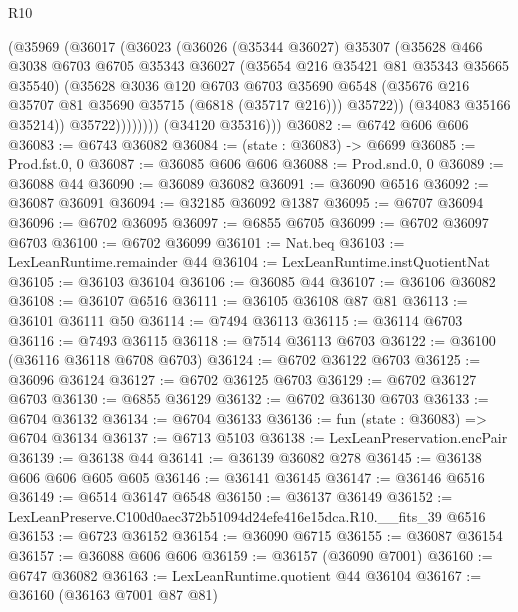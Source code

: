\begin{lexlean}{R10}
\begin{coremodule}
                  (@35969
                    (@36017
                      (@36023
                        (@36026
                          (@35344 @36027)
                          @35307
                          (@35628
                            @466
                            @3038
                            @6703
                            @6705
                            @35343
                            @36027
                            (@35654 @216 @35421 @81 @35343 @35665 @35540)
                            (@35628
                              @3036
                              @120
                              @6703
                              @6703
                              @35690
                              @6548
                              (@35676 @216 @35707 @81 @35690 @35715 (@6818 (@35717 @216)))
                              @35722))
                          (@34083 @35166 @35214))
                        @35722))))))))
        (@34120 @35316)))
@36082 := @6742 @606 @606
@36083 := @6743 @36082
@36084 := (state : @36083) -> @6699
@36085 := Prod.fst.{0, 0}
@36087 := @36085 @606 @606
@36088 := Prod.snd.{0, 0}
@36089 := @36088 @44
@36090 := @36089 @36082
@36091 := @36090 @6516
@36092 := @36087 @36091
@36094 := @32185 @36092 @1387
@36095 := @6707 @36094
@36096 := @6702 @36095
@36097 := @6855 @6705
@36099 := @6702 @36097 @6703
@36100 := @6702 @36099
@36101 := Nat.beq
@36103 := LexLeanRuntime.remainder @44
@36104 := LexLeanRuntime.instQuotientNat
@36105 := @36103 @36104
@36106 := @36085 @44
@36107 := @36106 @36082
@36108 := @36107 @6516
@36111 := @36105 @36108 @87 @81
@36113 := @36101 @36111 @50
@36114 := @7494 @36113
@36115 := @36114 @6703
@36116 := @7493 @36115
@36118 := @7514 @36113 @6703
@36122 := @36100 (@36116 @36118 @6708 @6703)
@36124 := @6702 @36122 @6703
@36125 := @36096 @36124
@36127 := @6702 @36125 @6703
@36129 := @6702 @36127 @6703
@36130 := @6855 @36129
@36132 := @6702 @36130 @6703
@36133 := @6704 @36132
@36134 := @6704 @36133
@36136 := fun (state : @36083) => @6704 @36134
@36137 := @6713 @5103
@36138 := LexLeanPreservation.encPair
@36139 := @36138 @44
@36141 := @36139 @36082 @278
@36145 := @36138 @606 @606 @605 @605
@36146 := @36141 @36145
@36147 := @36146 @6516
@36149 := @6514 @36147 @6548
@36150 := @36137 @36149
@36152 := LexLeanPreserve.C100d0aec372b51094d24efe416e15dca.R10.__fits_39 @6516
@36153 := @6723 @36152
@36154 := @36090 @6715
@36155 := @36087 @36154
@36157 := @36088 @606 @606
@36159 := @36157 (@36090 @7001)
@36160 := @6747 @36082
@36163 := LexLeanRuntime.quotient @44 @36104
@36167 := @36160 (@36163 @7001 @87 @81)

\end{coremodule}
\end{lexlean}

